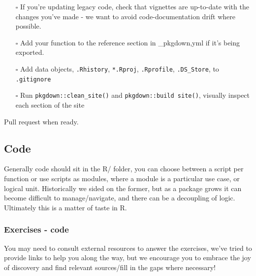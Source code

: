\documentclass[
  letterpaper,
  DIV=11,
  numbers=noendperiod]{scrreprt}
\begin{document}
\begin{itemize}
\item[$\square$]
  If you're updating legacy code, check that vignettes are up-to-date
  with the changes you've made - we want to avoid code-documentation
  drift where possible.
\item[$\square$]
  Add your function to the reference section in \_pkgdown,yml if it's
  being exported.
\item[$\square$]
  Add data objects, \texttt{.Rhistory}, \texttt{*.Rproj},
  \texttt{.Rprofile}, \texttt{.DS\_Store}, to \texttt{.gitignore}
\item[$\square$]
  Run \texttt{pkgdown::clean\_site()} and
  \texttt{pkgdown::build\ site()}, visually inspect each section of the
  site
\end{itemize}

Pull request when ready.

\subsection{Code}\label{code-1}

Generally code should sit in the R/ folder, you can choose between a
script per function or use scripts as modules, where a module is a
particular use case, or logical unit. Historically we sided on the
former, but as a package grows it can become difficult to
manage/navigate, and there can be a decoupling of logic. Ultimately this
is a matter of taste in R.

\subsubsection{Exercises - code}\label{exercises---code}

\begin{tcolorbox}[enhanced jigsaw, opacitybacktitle=0.6, breakable, title=\textcolor{quarto-callout-warning-color}{\faExclamationTriangle}\hspace{0.5em}{Exercises}, arc=.35mm, colframe=quarto-callout-warning-color-frame, colbacktitle=quarto-callout-warning-color!10!white, left=2mm, bottomrule=.15mm, opacityback=0, toprule=.15mm, bottomtitle=1mm, toptitle=1mm, titlerule=0mm, leftrule=.75mm, colback=white, rightrule=.15mm, coltitle=black]

You may need to consult external resources to answer the exercises,
we've tried to provide links to help you along the way, but we encourage
you to embrace the joy of discovery and find relevant sources/fill in
the gaps where necessary!

\end{tcolorbox}
\end{document}
